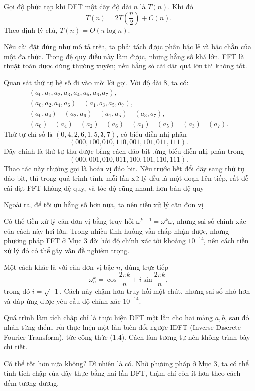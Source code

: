 \documentclass[11pt]{article}
\begin{document}
Gọi độ phức tạp khi DFT một dãy độ dài \(n\) là \(T(n)\). Khi đó
\[
  T(n)=2T\left(\frac{n}{2}\right)+O(n). \tag{1.11}
\]
Theo định lý chủ, \(T(n)=O(n\log n)\).

Nếu cài đặt đúng như mô tả trên, ta phải tách được phần bậc lẻ và bậc chẵn của
một đa thức. Trong đệ quy điều này làm được, nhưng hằng số khá lớn. FFT là
thuật toán được dùng thường xuyên; nếu hằng số cài đặt quá lớn thì không tốt.

Quan sát thứ tự hệ số đi vào mỗi lời gọi. Với độ dài \(8\), ta có:
\[
\begin{gathered}
(a_0,a_1,a_2,a_3,a_4,a_5,a_6,a_7),\\
(a_0,a_2,a_4,a_6)\quad(a_1,a_3,a_5,a_7),\\
(a_0,a_4)\quad(a_2,a_6)\quad(a_1,a_5)\quad(a_3,a_7),\\
(a_0)\quad(a_4)\quad(a_2)\quad(a_6)\quad(a_1)\quad(a_5)\quad(a_3)\quad(a_7).
\end{gathered}
\]
Thứ tự chỉ số là \((0,4,2,6,1,5,3,7)\), có biểu diễn nhị phân
\[
  (000,100,010,110,001,101,011,111).
\]
Đây chính là thứ tự thu được bằng cách đảo bit từng biểu diễn nhị phân trong
\[
  (000,001,010,011,100,101,110,111).
\]
Thao tác này thường gọi là hoán vị đảo bit. Nếu trước hết đổi dãy sang thứ tự
đảo bit, thì trong quá trình tính, mỗi lần xử lý đều là một đoạn liên tiếp,
rất dễ cài đặt FFT không đệ quy, và tốc độ cũng nhanh hơn bản đệ quy.

Ngoài ra, để tối ưu hằng số hơn nữa, ta nên tiền xử lý căn đơn vị.

Có thể tiền xử lý căn đơn vị bằng truy hồi
\(\omega^{k+1}=\omega^k\omega\), nhưng sai số chính xác của cách này hơi lớn.
Trong nhiều tình huống vẫn chấp nhận được, nhưng phương pháp FFT ở Mục 3 đòi
hỏi độ chính xác tới khoảng \(10^{-14}\), nên cách tiền xử lý đó có thể gây
vấn đề nghiêm trọng.

Một cách khác là với căn đơn vị bậc \(n\), dùng trực tiếp
\[
  \omega_n^k=\cos\frac{2\pi k}{n}+i\sin\frac{2\pi k}{n},
\]
trong đó \(i=\sqrt{-1}\). Cách này chậm hơn truy hồi một chút, nhưng sai số
nhỏ hơn và đáp ứng được yêu cầu độ chính xác \(10^{-14}\).

Quá trình làm tích chập chỉ là thực hiện DFT một lần cho hai mảng \(a,b\), sau
đó nhân từng điểm, rồi thực hiện một lần biến đổi ngược IDFT (Inverse Discrete
Fourier Transform), tức công thức (1.4). Cách làm tương tự nên không trình bày
chi tiết.

Có thể tốt hơn nữa không? Dĩ nhiên là có. Nhờ phương pháp ở Mục 3, ta có thể
tính tích chập của dãy thực bằng hai lần DFT, thậm chí còn ít hơn theo cách
đếm tương đương.
\end{document}
